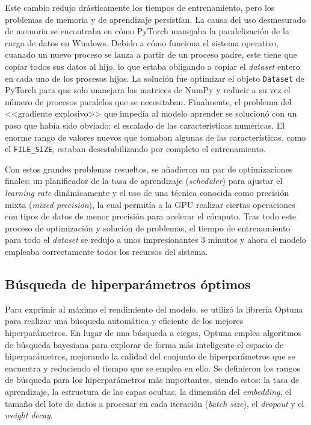 Este cambio redujo drásticamente los tiempos de entrenamiento, pero los problemas de memoria y de aprendizaje persistían. La causa del uso desmesurado de memoria se encontraba en cómo PyTorch manejaba la paralelización de la carga de datos en Windows. Debido a cómo funciona el sistema operativo, cuanado un nuevo proceso se lanza a partir de un proceso padre, este tiene que copiar todos sus datos al hijo, lo que estaba obligando a copiar el \textit{dataset} entero en cada uno de los procesos hijos. La solución fue optimizar el objeto \texttt{Dataset} de PyTorch para que solo manejara las matrices de NumPy y reducir a su vez el número de procesos paralelos que se necesitaban. Finalmente, el problema del <<gradiente explosivo>> que impedía al modelo aprender se solucionó con un paso que había sido obviado: el escalado de las características numéricas. El enorme rango de valores nuevos que tomaban algunas de las características, como el \texttt{FILE\_SIZE}, estaban desestabilizando por completo el entrenamiento.

Con estos grandes problemas resueltos, se añadieron un par de optimizaciones finales: un planificador de la tasa de aprendizaje (\textit{scheduler}) para ajustar el \textit{learning rate} dinámicamente y el uso de una técnica conocida como precisión mixta (\textit{mixed precision}), la cual permitía a la GPU realizar ciertas operaciones con tipos de datos de menor precisión para acelerar el cómputo. Tras todo este proceso de optimización y solución de problemas, el tiempo de entrenamiento para todo el \textit{dataset} se redujo a unos impresionantes 3 minutos y ahora el modelo empleaba correctamente todos los recursos del sistema.

\subsection{Búsqueda de hiperparámetros óptimos}

Para exprimir al máximo el rendimiento del modelo, se utilizó la librería Optuna para realizar una búsqueda automática y eficiente de los mejores hiperparámetros. En lugar de una búsqueda a ciegas, Optuna emplea algoritmos de búsqueda bayesiana para explorar de forma más inteligente el espacio de hiperparámetros, mejorando la calidad del conjunto de hiperparámetros que se encuentra y reduciendo el tiempo que se emplea en ello. Se definieron los rangos de búsqueda para los hiperparámetros más importantes, siendo estos: la tasa de aprendizaje, la estructura de las capas ocultas, la dimensión del \textit{embedding}, el tamaño del lote de datos a procesar en cada iteración (\textit{batch size}), el \textit{dropout} y el \textit{weight decay}.


